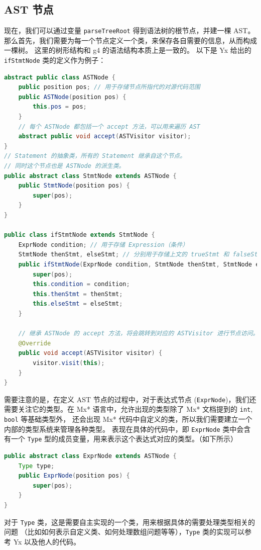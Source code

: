 \subsection{AST 节点}
现在，我们可以通过变量 \texttt{parseTreeRoot} 得到语法树的根节点，并建一棵 AST。
那么首先，我们需要为每一个节点定义一个类，来保存各自需要的信息，从而构成一棵树。
这里的树形结构和 g4 的语法结构本质上是一致的。
以下是 Yx 给出的 \texttt{ifStmtNode} 类的定义作为例子：
\begin{lstlisting}[language=Java]
abstract public class ASTNode {
    public position pos; // 用于存储节点所指代的对源代码范围
    public ASTNode(position pos) {
        this.pos = pos;
    }
    // 每个 ASTNode 都包括一个 accept 方法，可以用来遍历 AST
    abstract public void accept(ASTVisitor visitor);
}
// Statement 的抽象类，所有的 Statement 继承自这个节点。
// 同时这个节点也是 ASTNode 的派生类。
public abstract class StmtNode extends ASTNode {
    public StmtNode(position pos) {
        super(pos);
    }
}

public class ifStmtNode extends StmtNode {
    ExprNode condition; // 用于存储 Expression（条件）
    StmtNode thenStmt, elseStmt; // 分别用于存储上文的 trueStmt 和 falseStmt
    public ifStmtNode(ExprNode condition, StmtNode thenStmt, StmtNode elseStmt, position pos) {
        super(pos);
        this.condition = condition;
        this.thenStmt = thenStmt;
        this.elseStmt = elseStmt;
    }
    
    // 继承 ASTNode 的 accept 方法，将会跳转到对应的 ASTVisitor 进行节点访问。
    @Override
    public void accept(ASTVisitor visitor) {
        visitor.visit(this);
    }
}
\end{lstlisting}

需要注意的是，在定义 AST 节点的过程中，对于表达式节点 (\texttt{ExprNode})，我们还需要关注它的类型。在
Mx* 语言中，允许出现的类型除了 Mx* 文档提到的 \texttt{int}, \texttt{bool} 等基础类型外，
还会出现 Mx* 代码中自定义的类，所以我们需要建立一个内部的类型系统来管理各种类型。
表现在具体的代码中，即 \texttt{ExprNode} 类中会含有一个 \texttt{Type}
型的成员变量，用来表示这个表达式对应的类型。（如下所示）
\begin{lstlisting}[language=Java]
public abstract class ExprNode extends ASTNode {
    Type type;
    public ExprNode(position pos) {
        super(pos);
    }
}
\end{lstlisting}
对于 \texttt{Type} 类，这是需要自主实现的一个类，用来根据具体的需要处理类型相关的问题
（比如如何表示自定义类、如何处理数组问题等等），\texttt{Type} 类的实现可以参考 Yx 以及他人的代码。


